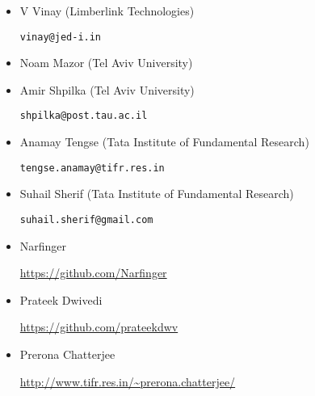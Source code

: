 \begin{itemize}
\item V Vinay (Limberlink Technologies)

\texttt{vinay@jed-i.in}

\item Noam Mazor (Tel Aviv University)

\item Amir Shpilka (Tel Aviv University)

\texttt{shpilka@post.tau.ac.il}

\item Anamay Tengse (Tata Institute of Fundamental Research)

\texttt{tengse.anamay@tifr.res.in}

\item Suhail Sherif (Tata Institute of Fundamental Research)

\texttt{suhail.sherif@gmail.com}

\item Narfinger

  \url{https://github.com/Narfinger}

\item Prateek Dwivedi

  \url{https://github.com/prateekdwv}

\item Prerona Chatterjee

  \url{http://www.tifr.res.in/~prerona.chatterjee/}
  
\end{itemize}


